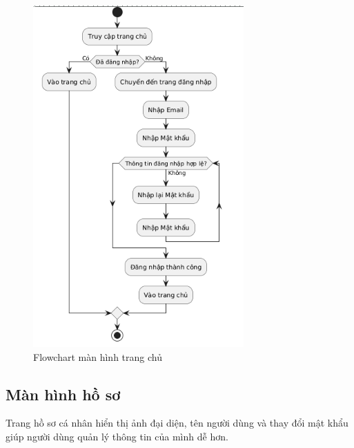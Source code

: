 \begin{figure}
    \centering
    \includegraphics[width=1\linewidth]{images/flowchart-trang-chu.png}
    \caption{Flowchart màn hình trang chủ}
    \label{fig:flowchart-trang-chu}
\end{figure}

\subsection{Màn hình hồ sơ}
\label{subsec:ho-so}

Trang hồ sơ cá nhân hiển thị ảnh đại diện, tên người dùng và thay đổi mật khẩu giúp người dùng quản lý thông tin của mình dễ hơn.

